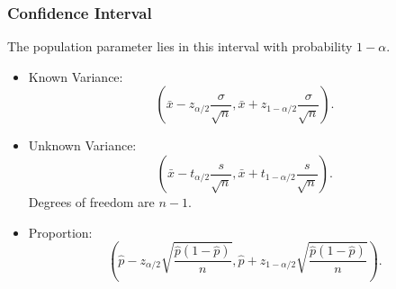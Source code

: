 \documentclass{beamer}
\begin{document}
\begin{frame}
\frametitle{Confidence Interval}
The population parameter lies in this interval with probability $1 - \alpha$.
\begin{itemize}
\item Known Variance: 
$$
\left(\bar{x} - z_{\alpha/2} \frac{\sigma}{\sqrt{n}}, \bar{x} + z_{1 - \alpha/2} \frac{\sigma}{\sqrt{n}}\right).
$$
\item Unknown Variance: 
$$
\left(\bar{x} - t_{\alpha/2} \frac{s}{\sqrt{n}}, \bar{x} + t_{1 - \alpha/2} \frac{s}{\sqrt{n}}\right).
$$ 
Degrees of freedom are $n-1$.
\item Proportion: 
$$
\left(\hat{p} - z_{\alpha/2}\sqrt{\frac{\hat{p}(1 - \hat{p})}{n}}, \hat{p} + z_{1 - \alpha/2} \sqrt{\frac{\hat{p}(1 - \hat{p})}{n}}\right).
$$
\end{itemize}
\end{frame}
\end{document}
